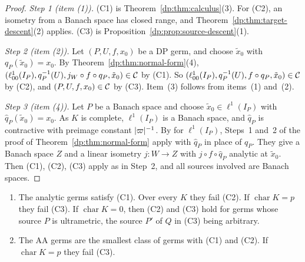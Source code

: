 \begin{proof}
\emph{Step 1 (item (1)).} (C1) is Theorem~\ref{dp:thm:calculus}(3). For (C2), an isometry from a Banach space has closed range, and Theorem~\ref{dp:thm:target-descent}(2) applies. (C3) is Proposition~\ref{dp:prop:source-descent}(1).

\emph{Step 2 (item (2)).} Let $(P,U,f,x_0)$ be a DP germ, and choose $\tilde x_0$ with $q_P(\tilde x_0)=x_0$. By Theorem~\ref{dp:thm:normal-form}(4), $(\ell^1_{00}(I_P),q_P^{-1}(U),j_W\circ f\circ q_P,\tilde x_0)\in\mathcal{C}$ by (C1). So $(\ell^1_{00}(I_P),q_P^{-1}(U),f\circ q_P,\tilde x_0)\in\mathcal{C}$ by (C2), and $(P,U,f,x_0)\in\mathcal{C}$ by (C3). Item~(3) follows from items~(1) and~(2).

\emph{Step 3 (item (4)).} Let $P$ be a Banach space and choose $\tilde x_0\in\ell^1(I_P)$ with $\hat q_P(\tilde x_0)=x_0$. As $K$ is complete, $\ell^1(I_P)$ is a Banach space, and $\hat q_P$ is contractive with preimage constant $\lvert \varpi\rvert^{-1}$. By \cite[Theorem~14.39(2)]{I} for $\ell^1(I_P)$, Steps~1 and~2 of the proof of Theorem~\ref{dp:thm:normal-form} apply with $\hat q_P$ in place of $q_P$. They give a Banach space $Z$ and a linear isometry $j\colon W\to Z$ with $j\circ f\circ\hat q_P$ analytic at $\tilde x_0$. Then (C1), (C2), (C3) apply as in Step~2, and all sources involved are Banach spaces.
\end{proof}

\begin{proposition}\label{dp:prop:other-classes}
\leavevmode
\begin{enumerate}
\item The analytic germs satisfy (C1). Over every $K$ they fail (C2). If $\operatorname{char}K=p$ they fail (C3). If $\operatorname{char}K=0$, then (C2) and (C3) hold for germs whose source $P$ is ultrametric, the source $P'$ of $Q$ in (C3) being arbitrary.
\item The AA germs are the smallest class of germs with (C1) and (C2). If $\operatorname{char}K=p$ they fail (C3).
\end{enumerate}
\end{proposition}

